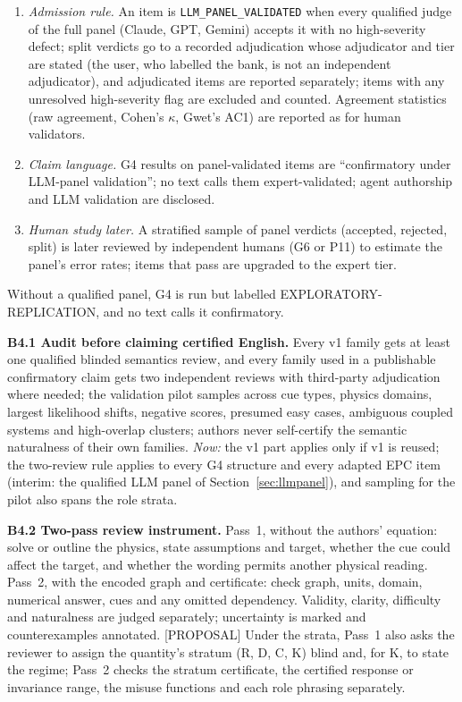 \documentclass[10pt,a4paper]{article}
\newcommand{\tg}[1]{\textsc{[#1]}}
\begin{document}
\begin{enumerate}
used to tune prompts.
\item \emph{Admission rule.} An item is \texttt{LLM\_PANEL\_VALIDATED} when every qualified judge of the full panel (Claude, GPT, Gemini) accepts it with
no high-severity defect; split verdicts go to a recorded adjudication whose adjudicator and tier are stated (the user, who
labelled the bank, is not an independent adjudicator), and adjudicated items are reported separately; items with any
unresolved high-severity flag are excluded and counted. Agreement statistics (raw agreement, Cohen's $\kappa$,
Gwet's AC1) are reported as for human validators.
\item \emph{Claim language.} G4 results on panel-validated items are ``confirmatory under LLM-panel validation'';
no text calls them expert-validated; agent authorship and LLM validation are disclosed.
\item \emph{Human study later.} A stratified sample of panel verdicts (accepted, rejected, split) is later reviewed
by independent humans (G6 or P11) to estimate the panel's error rates; items that pass are upgraded to the
expert tier.
\end{enumerate}
Without a qualified panel, G4 is run but labelled EXPLORATORY-REPLICATION, and no text calls it confirmatory.

\textbf{B4.1 Audit before claiming certified English.} Every v1 family gets at least one qualified blinded
semantics review, and every family used in a publishable confirmatory claim gets two independent reviews with
third-party adjudication where needed; the validation pilot samples across cue types, physics domains, largest
likelihood shifts, negative scores, presumed easy cases, ambiguous coupled systems and high-overlap clusters;
authors never self-certify the semantic naturalness of their own families. \emph{Now:} the v1 part applies only if
v1 is reused; the two-review rule applies to every G4 structure and every adapted EPC item (interim: the qualified
LLM panel of Section~\ref{sec:llmpanel}), and sampling for the
pilot also spans the role strata.

\textbf{B4.2 Two-pass review instrument.} Pass~1, without the authors' equation: solve or outline the physics,
state assumptions and target, whether the cue could affect the target, and whether the wording permits another
physical reading. Pass~2, with the encoded graph and certificate: check graph, units, domain, numerical answer,
cues and any omitted dependency. Validity, clarity, difficulty and naturalness are judged separately;
uncertainty is marked and counterexamples annotated. \tg{PROPOSAL} Under the strata, Pass~1 also asks the reviewer
to assign the quantity's stratum (R, D, C, K) blind and, for K, to state the regime; Pass~2 checks the stratum
certificate, the certified response or invariance range, the misuse functions and each role phrasing separately.
\end{document}
